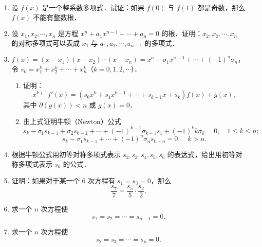 \begin{enumerate}
\begin{enumerate}
  \anssub
    \item 一个二次多项式 $f(x)$，它在 $x=0,\dfrac{\pi}{2},\pi$ 处与函数 $\sin x$ 有相同的值；
  \anssub
    \item 一个次数尽可能低的多项式 $f(x)$，使 $f(0)=1$，$f(1)=2$，$f(2)=5$，$f(3)=10$．
  \anssub
  \end{enumerate}
  \item 设 $f(x)$ 是一个整系数多项式．试证：如果 $f(0)$ 与 $f(1)$ 都是奇数，那么 $f(x)$ 不能有整数根．
  \ansproof
  \item 设 $x_1,x_2,\cdots,x_n$ 是方程 $x^n+a_1x^{n-1}+\cdots+a_n=0$ 的根．证明：$x_2,x_3,\cdots,x_n$ 的对称多项式可以表成 $x_1$ 与 $a_1,a_2,\cdots,a_{n-1}$ 的多项式．
  \ansproof
  \item $f(x)=(x-x_1)(x-x_2)\cdots(x-x_n)=x^n-\sigma_1x^{n-1}+\cdots+(-1)^n\sigma_n$，令 $s_k=x_1^k+x_2^k+\cdots+x_n^k$（$k=0,1,2,\cdots$）．
  \begin{enumerate}
    \item 证明：
    \[
      x^{k+1}f'(x)=(s_0x^k+s_1x^{k-1}+\cdots+s_{k-1}x+s_k)f(x)+g(x),
    \]
    其中 $\partial(g(x))<n$ 或 $g(x)=0$．
  \anssub
    \item 由上式证明牛顿（Newton）公式
    \[
      s_k-\sigma_1s_{k-1}+\sigma_2s_{k-2}+\cdots+(-1)^{k-1}\sigma_{k-1}s_1+(-1)^kk\sigma_k=0,\quad 1\leq k\leq n;
    \]
    \[
      s_k-\sigma_1s_{k-1}+\cdots+(-1)^n\sigma_ns_{k-n}=0,\quad k>n.
    \]
  \anssub
  \end{enumerate}
  \item 根据牛顿公式用初等对称多项式表示 $s_2,s_3,s_4,s_5,s_6$ 的表达式，给出用初等对称多项式表示 $s_k$ 的公式．
  \ansgeneral
  \item 证明：如果对于某一个 $6$ 次方程有 $s_1=s_3=0$，那么
  \[
    \frac{s_7}{7}=\frac{s_5}{5}\cdot\frac{s_2}{2}.
  \]
  \ansproof
  \item 求一个 $n$ 次方程使
  \[
    s_1=s_2=\cdots=s_{n-1}=0.
  \]
  \anscompute
  \item 求一个 $n$ 次方程使
  \[
    s_2=s_3=\cdots=s_n=0.
  \]
  \anscompute
\end{enumerate}
